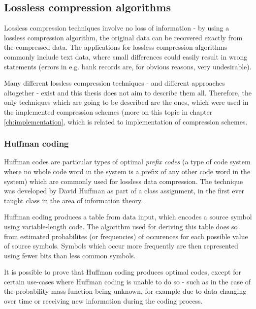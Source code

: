 \documentclass[thesis=M,english]{FITthesis}[2012/10/20]
\begin{document}
\subsection{Lossless compression algorithms}
Lossless compression techniques involve no loss of information - by using
a lossless compression algorithm, the original data can be recovered exactly from the
compressed data. The applications for lossless compression algorithms commonly include
text data, where small differences could easily result in wrong statements
(errors in e.g. bank records are, for obvious reasons, very undesirable).

Many different lossless compression techniques - and different approaches altogether -
exist and this thesis does not aim to describe them all. Therefore, the only techniques
which are going to be described are the ones, which were used in the implemented compression
schemes (more on this topic in chapter \ref{ch:implementation}, which is related to
implementation of compression schemes.

\subsubsection{Huffman coding}
Huffman codes are particular types of optimal \emph{prefix codes} (a type of
code system where no whole code word in the system is a prefix of any other
code word in the system) which are commonly used for lossless data compression.
The technique was developed by David Huffman as part of a class assignment, in the
first ever taught class in the area of information theory.\cite{datacompression}

Huffman coding produces a table from data input, which encodes a source symbol using
variable-length code. The algorithm used for deriving this table does so from estimated
probabilites (or frequencies) of occurences for each possible value of source symbols.
Symbols which occur more frequently are then represented using fewer bits than less
common symbols.\cite{huffman}

It is possible to prove that Huffman coding produces optimal codes, except for
certain use-cases where Huffman coding is unable to do so - such as in the case
of the probability mass function being unknown, for example due to data changing over
time or receiving new information during the coding process.
\end{document}
